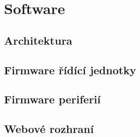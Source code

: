 \chapter{Software}
\section{Architektura}
\section{Firmware řídící jednotky}
\section{Firmware periferií}
\section{Webové rozhraní}